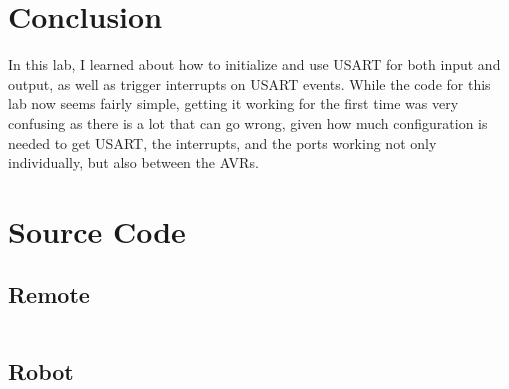 \documentclass[12pt,letterpaper]{article}
\begin{document}
\section{Conclusion}

In this lab, I learned about how to initialize and use USART for both input and
output, as well as trigger interrupts on USART events.  While the code for this
lab now seems fairly simple, getting it working for the first time was very
confusing as there is a lot that can go wrong, given how much configuration is
needed to get USART, the interrupts, and the ports working not only
individually, but also between the AVRs.

\section{Source Code}

\subsection{Remote}

\begin{verbatim}
\end{verbatim}

\subsection{Robot}

\begin{verbatim}
\end{verbatim}
\end{document}
